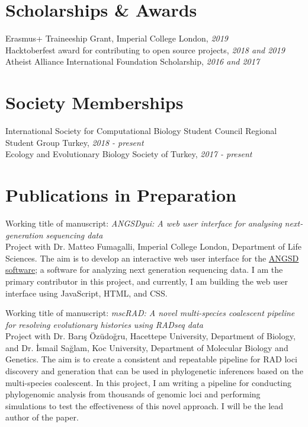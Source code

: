 \documentclass[letterpaper,11pt]{article}
\begin{document}
\section{Scholarships \& Awards}
Erasmus+ Traineeship Grant, Imperial College London, \textit{2019} \\
Hacktoberfest award for contributing to open source projects, \textit{2018 and 2019} \\
Atheist Alliance International Foundation Scholarship, \textit{2016 and 2017} \\


\section{Society Memberships}	
International Society for Computational Biology Student Council Regional Student Group Turkey, \textit{2018 - present} \\
Ecology and Evolutionary Biology Society of Turkey, \textit{2017 - present} \\



\section{Publications in Preparation}

Working title of manuscript: \textit{ANGSDgui: A web user interface for analysing next‐generation sequencing data}\\
Project with Dr. Matteo Fumagalli, Imperial College London, Department of Life Sciences. The aim is to develop an interactive web user interface for the \href{http://www.popgen.dk/angsd/index.php/ANGSD}{ANGSD software}; a software for analyzing next generation sequencing data. I am the primary contributor in this project, and currently, I am building the web user interface using JavaScript, HTML, and CSS.
\medskip

Working title of manuscript: \textit{mscRAD: A novel multi-species coalescent pipeline for resolving evolutionary histories using RADseq data} \\
Project with Dr. Bar{\i}\c{s} \"{O}z\"{u}do\u{g}ru, Hacettepe University, Department of Biology, and Dr. \.{I}smail Sa\u{g}lam, Koc University, Department of Molecular Biology and Genetics. The aim is to create a consistent and repeatable pipeline for RAD loci discovery and generation that can be used in phylogenetic inferences based on the multi-species coalescent. In this project, I am writing a pipeline for conducting phylogenomic analysis from thousands of genomic loci and performing simulations to test the effectiveness of this novel approach. I will be the lead author of the paper.
\medskip
\end{document}
